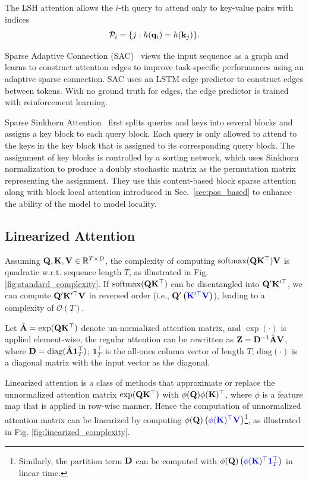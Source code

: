 \documentclass[manuscript,acmsmall,screen,nonacm]{acmart}
\theoremstyle{definition}
\begin{document}
The LSH attention allows the $i$-th query to attend only to key-value pairs with indices
\begin{equation}
    \mathcal{P}_i=\{j: h(\mathbf{q}_i)=h(\mathbf{k}_j) \}.
\end{equation}

Sparse Adaptive Connection (SAC)~\cite{li2020sac} views the input sequence as a graph and learns to construct attention edges to improve task-specific performances using an adaptive sparse connection. SAC uses an LSTM edge predictor to construct edges between tokens. With no ground truth for edges, the edge predictor is trained with reinforcement learning.

Sparse Sinkhorn Attention~\cite{tay2020sparse} first splits queries and keys into several blocks and assigns a key block to each query block. Each query is only allowed to attend to the keys in the key block that is assigned to its corresponding query block. The assignment of key blocks is controlled by a sorting network, which uses Sinkhorn normalization to produce a doubly stochastic matrix as the permutation matrix representing the assignment. They use this content-based block sparse attention along with block local attention introduced in Sec.~\ref{sec:pos_based} to enhance the ability of the model to model locality.

\subsection{Linearized Attention}\label{sec:kernel}

Assuming $\mathbf{Q},\mathbf{K},\mathbf{V}\in \mathbb{R}^{T\times D}$, the complexity of computing $\operatorname*{softmax}(\mathbf{Q}\mathbf{K}^\top)\mathbf{V}$ is quadratic w.r.t. sequence length $T$, as illustrated in Fig. \ref{fig:standard_complexity}. If $\operatorname*{softmax}(\mathbf{Q}\mathbf{K}^\top)$ can be disentangled into $\mathbf{Q}'\mathbf{K}'^\top$, we can compute $\mathbf{Q}'\mathbf{K}'^\top\mathbf{V}$ in reversed order (i.e., $\bQ'\left(\textcolor[rgb]{0,0,1}{\bK'^\top\bV}\right)$), leading to a complexity of $\mathcal{O}(T)$.

Let $\hat{\mathbf{A}} = \exp(\mathbf{Q}\mathbf{K}^\top)$ denote un-normalized attention matrix, and $\exp(\cdot)$ is applied element-wise, the regular attention can be rewritten as $\mathbf{Z}={\mathbf{D}}^{-1}\hat{\mathbf{A}}\mathbf{V}$, where $\mathbf{D} = \mathrm{diag}(\hat{\mathbf{A}}\mathbf{1}_T^\top)$; $\mathbf{1}_T^\top$ is the all-ones column vector of length $T$; $\mathrm{diag}(\cdot)$ is a diagonal
matrix with the input vector as the diagonal.

Linearized attention is a class of methods that approximate or replace the unnormalized attention matrix $\exp(\mathbf{Q}\mathbf{K}^\top)$ with $\phi(\mathbf{Q})\phi(\mathbf{K})^\top$, where $\phi$ is a feature map that is applied in row-wise manner. Hence the computation of unnormalized attention matrix can be linearized by computing $\phi(\bQ)\left(\textcolor[rgb]{0,0,1}{\phi(\bK)^\top\bV}\right)$\footnote{Similarly, the partition term $\mathbf{D}$ can be computed with $\phi(\bQ)\left(\textcolor[rgb]{0,0,1}{\phi(\bK)^\top\mathbf{1}_T^\top}\right)$ in linear time.}, as illustrated in Fig. \ref{fig:linearized_complexity}.
\end{document}
